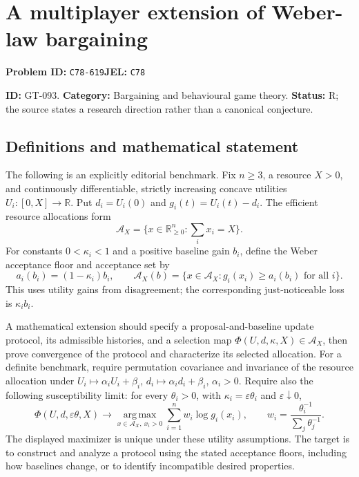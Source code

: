 \documentclass[11pt,a4paper]{article}
\begin{document}
\section*{A multiplayer extension of Weber-law bargaining}
\textbf{Problem ID:} \texttt{C78-619}\quad \textbf{JEL:} \texttt{C78}\par
\label{problem:OP-0223}
\label{game:GT-093}
{\sffamily\small\color{muted}
\noindent\textbf{ID:} GT-093. \textbf{Category:} Bargaining and behavioural game theory.
\textbf{Status:} R; the source states a research direction rather than a canonical conjecture.
\par}
\subsection*{Definitions and mathematical statement}
The following is an explicitly editorial benchmark. Fix $n\geq3$, a resource $X>0$, and continuously differentiable, strictly increasing concave utilities $U_i:[0,X]\to\mathbb R$. Put $d_i=U_i(0)$ and $g_i(t)=U_i(t)-d_i$. The efficient resource allocations form
\[
 \mathcal A_X=\{x\in\mathbb R_{\geq0}^n:\sum_i x_i=X\}.
\]
For constants $0<\kappa_i<1$ and a positive baseline gain $b_i$, define the Weber acceptance floor and acceptance set by
\[
 a_i(b_i)=(1-\kappa_i)b_i,\qquad
 \mathcal A_X(b)=\{x\in\mathcal A_X:g_i(x_i)\geq a_i(b_i)\text{ for all }i\}.
\]
This uses utility gains from disagreement; the corresponding just-noticeable loss is $\kappa_i b_i$.

A mathematical extension should specify a proposal-and-baseline update protocol, its admissible histories, and a selection map
$\Phi(U,d,\kappa,X)\in\mathcal A_X$, then prove convergence of the protocol and characterize its selected allocation. For a definite benchmark, require permutation covariance and invariance of the resource allocation under $U_i\mapsto\alpha_iU_i+\beta_i$, $d_i\mapsto\alpha_id_i+\beta_i$, $\alpha_i>0$. Require also the following susceptibility limit: for every $\theta_i>0$, with $\kappa_i=\varepsilon\theta_i$ and $\varepsilon\downarrow0$,
\[
 \Phi(U,d,\varepsilon\theta,X)\longrightarrow
 \operatorname*{arg\,max}_{x\in\mathcal A_X,\ x_i>0}
          \sum_{i=1}^n w_i\log g_i(x_i),\qquad
 w_i=\frac{\theta_i^{-1}}{\sum_j\theta_j^{-1}}.
\]
The displayed maximizer is unique under these utility assumptions. The target is to construct and analyze a protocol using the stated acceptance floors, including how baselines change, or to identify incompatible desired properties.
\end{document}

